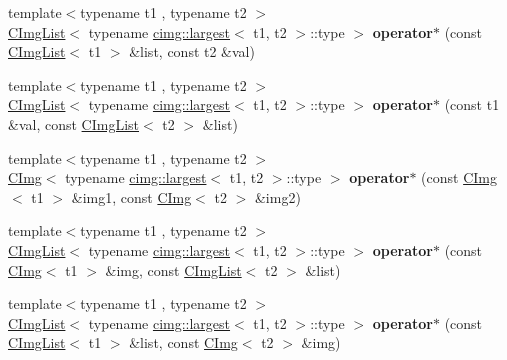 \begin{DoxyCompactItemize}
\item 
\hypertarget{namespacecimg__library_aa56113cadd46f7814bf1ede8ecd6a8af}{
{\footnotesize template$<$typename t1 , typename t2 $>$ }\\\hyperlink{structcimg__library_1_1_c_img_list}{CImgList}$<$ typename \hyperlink{structcimg__library_1_1cimg_1_1largest}{cimg::largest}$<$ t1, t2 $>$::type $>$ {\bfseries operator$\ast$} (const \hyperlink{structcimg__library_1_1_c_img_list}{CImgList}$<$ t1 $>$ \&list, const t2 \&val)}
\label{namespacecimg__library_aa56113cadd46f7814bf1ede8ecd6a8af}

\item 
\hypertarget{namespacecimg__library_a988443b429fa898b647f55e9956fc575}{
{\footnotesize template$<$typename t1 , typename t2 $>$ }\\\hyperlink{structcimg__library_1_1_c_img_list}{CImgList}$<$ typename \hyperlink{structcimg__library_1_1cimg_1_1largest}{cimg::largest}$<$ t1, t2 $>$::type $>$ {\bfseries operator$\ast$} (const t1 \&val, const \hyperlink{structcimg__library_1_1_c_img_list}{CImgList}$<$ t2 $>$ \&list)}
\label{namespacecimg__library_a988443b429fa898b647f55e9956fc575}

\item 
\hypertarget{namespacecimg__library_ad47fa91840089f9bcf0b75001812ba84}{
{\footnotesize template$<$typename t1 , typename t2 $>$ }\\\hyperlink{structcimg__library_1_1_c_img}{CImg}$<$ typename \hyperlink{structcimg__library_1_1cimg_1_1largest}{cimg::largest}$<$ t1, t2 $>$::type $>$ {\bfseries operator$\ast$} (const \hyperlink{structcimg__library_1_1_c_img}{CImg}$<$ t1 $>$ \&img1, const \hyperlink{structcimg__library_1_1_c_img}{CImg}$<$ t2 $>$ \&img2)}
\label{namespacecimg__library_ad47fa91840089f9bcf0b75001812ba84}

\item 
\hypertarget{namespacecimg__library_a07d48b7a008875794ecf013485c21d86}{
{\footnotesize template$<$typename t1 , typename t2 $>$ }\\\hyperlink{structcimg__library_1_1_c_img_list}{CImgList}$<$ typename \hyperlink{structcimg__library_1_1cimg_1_1largest}{cimg::largest}$<$ t1, t2 $>$::type $>$ {\bfseries operator$\ast$} (const \hyperlink{structcimg__library_1_1_c_img}{CImg}$<$ t1 $>$ \&img, const \hyperlink{structcimg__library_1_1_c_img_list}{CImgList}$<$ t2 $>$ \&list)}
\label{namespacecimg__library_a07d48b7a008875794ecf013485c21d86}

\item 
\hypertarget{namespacecimg__library_a53c9b24f7a43ff52c408bb9f8ccd8399}{
{\footnotesize template$<$typename t1 , typename t2 $>$ }\\\hyperlink{structcimg__library_1_1_c_img_list}{CImgList}$<$ typename \hyperlink{structcimg__library_1_1cimg_1_1largest}{cimg::largest}$<$ t1, t2 $>$::type $>$ {\bfseries operator$\ast$} (const \hyperlink{structcimg__library_1_1_c_img_list}{CImgList}$<$ t1 $>$ \&list, const \hyperlink{structcimg__library_1_1_c_img}{CImg}$<$ t2 $>$ \&img)}
\label{namespacecimg__library_a53c9b24f7a43ff52c408bb9f8ccd8399}


\end{DoxyCompactItemize}
